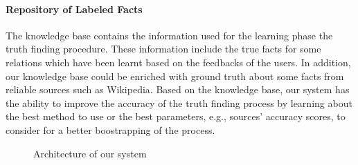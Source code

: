 \paragraph*{Repository of Labeled Facts}The knowledge base contains the information used for the learning
phase the truth finding procedure. These information include the true facts for some relations
which have been learnt based on the feedbacks of the users. In addition, our knowledge base could
be enriched with ground truth about some facts from reliable sources such as Wikipedia. Based on 
the knowledge base, our system has the ability to improve the accuracy of the truth finding process
by learning about the best method to use or the best parameters, e.g., sources' accuracy scores, to 
consider for a better boostrapping of the process.

\begin{figure}[ht]
\caption{Architecture of our system}\label{system_architecture}
\end{figure}

